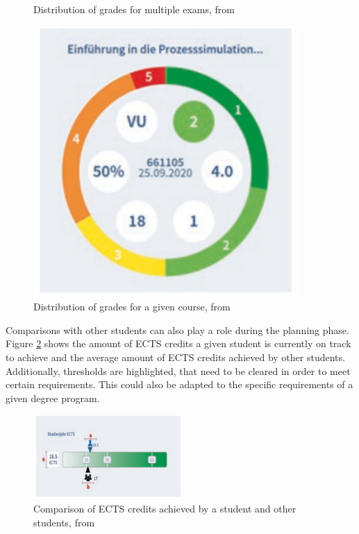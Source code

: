 \begin{figure}
\begin{minipage}[b]{0.4\textwidth}
        \caption{Distribution of grades for multiple exams, from \cite{LISSA}}
        \label{fig:comparison_exam.png}
    \end{minipage}
    \hfill
    \begin{minipage}[b]{0.4\textwidth}
        \centering
        \includegraphics[width=0.9\textwidth]{figures/comp_course.png}
        \caption{Distribution of grades for a given course, from \cite{Dashboard-StudentProgress}}
        \label{fig:comparison_course.png}
    \end{minipage}


\end{figure}

Comparisons with other students can also play a role during the planning phase. Figure \ref{fig:comparison_ects.png} shows the amount of ECTS credits a given student is currently on track to achieve and the average amount of ECTS credits achieved by other students.
Additionally, thresholds are highlighted, that need to be cleared in order to meet certain requirements. This could also be adapted to the specific requirements of a given degree program.

\begin{figure}
    \centering
    \includegraphics[width=0.5\textwidth]{figures/comp_ects.png}
    \caption{Comparison of ECTS credits achieved by a student and other students, from \cite{Dashboard-StudentProgress}}
    \label{fig:comparison_ects.png}
\end{figure}

